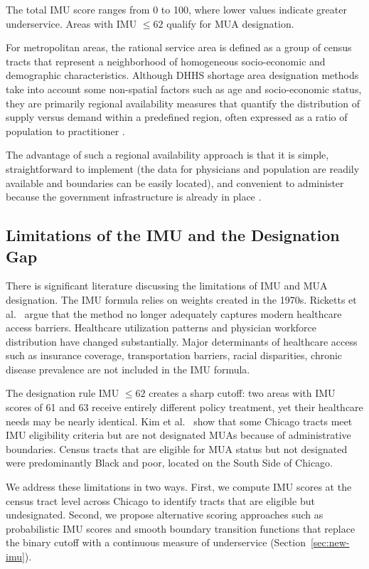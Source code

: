 \documentclass[11pt]{article}
\begin{document}
The total IMU score ranges from 0 to 100, where lower values indicate greater underservice. 
Areas with IMU $\leq 62$ qualify for MUA designation.

For metropolitan areas, the rational service area is defined as a group of census tracts that 
represent a neighborhood of homogeneous socio-economic and demographic characteristics. Although
DHHS shortage area designation methods take into account some non-spatial factors such as age
and socio-economic status, they are primarily regional availability measures that quantify the
distribution of supply versus demand within a predefined region, often expressed as a ratio of
population to practitioner \cite{ricketts2007designating}.

The advantage of such a regional availability approach is that it is simple, straightforward
to implement (the data for physicians and population are readily available and boundaries can
be easily located), and convenient to administer because the government infrastructure is already
in place \cite{ricketts2007designating}.


\subsection{Limitations of the IMU and the Designation Gap}\label{sec:imu-limitations}

There is significant literature discussing the limitations of IMU and MUA designation. The IMU formula
relies on weights created in the 1970s. Ricketts et al.\ \cite{ricketts2007designating} argue that the 
method no longer adequately captures modern healthcare access barriers. Healthcare utilization patterns 
and physician workforce distribution have changed substantially. Major determinants of healthcare access
such as insurance coverage, transportation barriers, racial disparities, chronic disease prevalence are 
not included in the IMU formula.

The designation rule IMU $\leq 62$ creates a sharp cutoff: two areas with IMU scores of 61 and 63 receive 
entirely different policy treatment, yet their healthcare needs may be nearly identical. Kim et al.\ \cite{kim2020uneven} 
show that some Chicago tracts meet IMU eligibility criteria but are not designated MUAs because of
administrative boundaries. Census tracts that are eligible for MUA status but not designated were predominantly 
Black and poor, located on the South Side of Chicago.

We address these limitations in two ways. First, we compute IMU scores at the census tract level across Chicago 
to identify tracts that are eligible but undesignated. Second, we propose alternative scoring approaches such as
probabilistic IMU scores and smooth boundary transition functions that replace the binary cutoff with a 
continuous measure of underservice (Section~\ref{sec:new-imu}).
\end{document}
